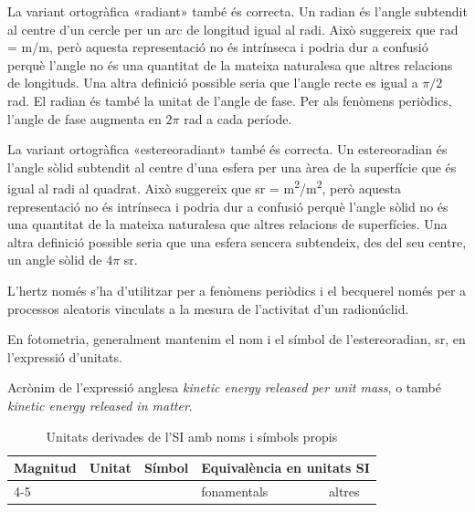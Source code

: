 \begin{ThreePartTable}
\begin{TableNotes}
    \item[\color{blue}(a)] {\footnotesize La variant ortogràfica «radiant» també és correcta. Un radian és   l'angle subtendit al centre d'un cercle per un arc de longitud igual al radi. Això suggereix que rad = m/m, però aquesta representació no és  intrínseca i podria dur a confusió perquè l'angle no és  una quantitat de la mateixa naturalesa que altres relacions de longituds. Una altra definició possible seria que  l'angle recte es igual a $\pi/2$ rad. El radian és també la unitat de l'angle de fase. Per als fenòmens periòdics, l'angle de fase augmenta en $2 \pi$ rad a cada període.}
    \item[\color{blue}(b)] {\footnotesize La variant ortogràfica «estereoradiant» també és correcta. Un estereoradian és l'angle sòlid subtendit al centre d'una esfera per una àrea de la superfície que és igual al radi al quadrat. Això suggereix que sr = \unit{m^2/m^2}, però aquesta representació no és intrínseca i podria dur a confusió perquè l'angle sòlid no és una quantitat de la mateixa naturalesa que altres relacions de superfícies. Una altra definició possible seria que una esfera sencera subtendeix, des del seu centre, un angle sòlid de $4 \pi$  sr.}
    \item[\color{blue}(c)] {\footnotesize L'hertz només s'ha d'utilitzar per a fenòmens periòdics i el becquerel només per a  processos aleatoris vinculats a la mesura de l'activitat d'un radionúclid.}
     \item[\color{blue}(d)] {\footnotesize En fotometria, generalment mantenim el nom i el símbol de l'estereoradian, sr, en l'expressió d'unitats.}
    \item[\color{blue}(e)] {\footnotesize Acrònim de l'expressió anglesa \textit{kinetic energy released  per unit mass}, o també \textit{kinetic energy released in matter}.}
\end{TableNotes}
\begin{longtable}[h]{llclc}
   \caption{\label{taula:SI-derivades} Unitats derivades de
   l'SI amb noms i símbols propis}\\
   \toprule[1pt]
    \multirow{2}{15mm}{\rule{0mm}{6mm}Magnitud} & \multirow{2}{15mm}{\rule{0mm}{6mm}Unitat}  &
    \multirow{2}{15mm}{\rule{0mm}{6mm}Símbol}  & \multicolumn{2}{c}{Equivalència en unitats SI}\\
    \cmidrule(rl){4-5}
    &  &   & fonamentals & altres\\

\end{longtable}
\end{ThreePartTable}
